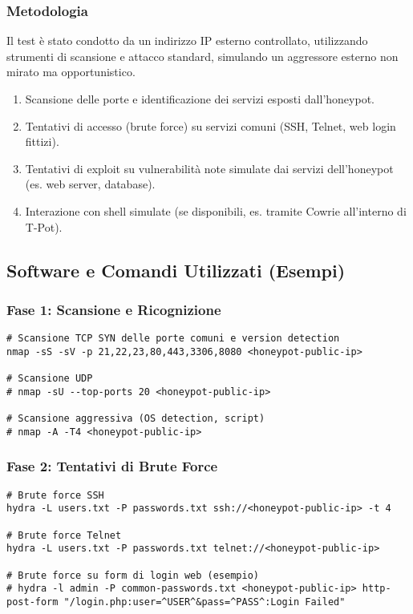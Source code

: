\subsubsection{Metodologia}
\label{subsubsec:metodologia_test}
Il test è stato condotto da un indirizzo IP esterno controllato, utilizzando strumenti di scansione e attacco standard, simulando un aggressore esterno non mirato ma opportunistico.
\begin{enumerate}
    \item Scansione delle porte e identificazione dei servizi esposti dall'honeypot.
    \item Tentativi di accesso (brute force) su servizi comuni (SSH, Telnet, web login fittizi).
    \item Tentativi di exploit su vulnerabilità note simulate dai servizi dell'honeypot (es. web server, database).
    \item Interazione con shell simulate (se disponibili, es. tramite Cowrie all'interno di T-Pot).
\end{enumerate}

\subsection{Software e Comandi Utilizzati (Esempi)}
\label{subsec:sw_comandi_test}

\subsubsection{Fase 1: Scansione e Ricognizione}
\label{subsubsec:fase1_test}
\begin{lstlisting}[caption={Comandi Nmap per la scansione iniziale}, label=lst:nmap_scan]
# Scansione TCP SYN delle porte comuni e version detection
nmap -sS -sV -p 21,22,23,80,443,3306,8080 <honeypot-public-ip>

# Scansione UDP
# nmap -sU --top-ports 20 <honeypot-public-ip>

# Scansione aggressiva (OS detection, script)
# nmap -A -T4 <honeypot-public-ip>
\end{lstlisting}

\subsubsection{Fase 2: Tentativi di Brute Force}
\label{subsubsec:fase2_test}
\begin{lstlisting}[caption={Attacchi di forza bruta con Hydra}, label=lst:hydra_brute]
# Brute force SSH
hydra -L users.txt -P passwords.txt ssh://<honeypot-public-ip> -t 4

# Brute force Telnet
hydra -L users.txt -P passwords.txt telnet://<honeypot-public-ip>

# Brute force su form di login web (esempio)
# hydra -l admin -P common-passwords.txt <honeypot-public-ip> http-post-form "/login.php:user=^USER^&pass=^PASS^:Login Failed"
\end{lstlisting}

